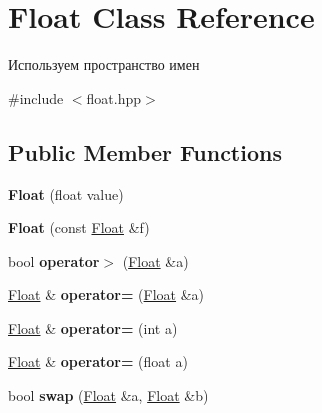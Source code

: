 \hypertarget{class_float}{\section{Float Class Reference}
\label{class_float}
}


Используем пространство имен  




{\ttfamily \#include $<$float.\-hpp$>$}

\subsection*{Public Member Functions}
\begin{DoxyCompactItemize}
\item 
\hypertarget{class_float_ac5e141ba92d856c7e79aa4e66a745f37}{{\bfseries Float} (float value)}\label{class_float_ac5e141ba92d856c7e79aa4e66a745f37}

\item 
\hypertarget{class_float_a60856232c5ef354213ca4ecb475d8a6f}{{\bfseries Float} (const \hyperlink{class_float}{Float} \&f)}\label{class_float_a60856232c5ef354213ca4ecb475d8a6f}

\item 
\hypertarget{class_float_a53950aae3831a057894e66bc11540e42}{bool {\bfseries operator$>$} (\hyperlink{class_float}{Float} \&a)}\label{class_float_a53950aae3831a057894e66bc11540e42}

\item 
\hypertarget{class_float_a4a77c416294ca66c1be47e2aa58902c8}{\hyperlink{class_float}{Float} \& {\bfseries operator=} (\hyperlink{class_float}{Float} \&a)}\label{class_float_a4a77c416294ca66c1be47e2aa58902c8}

\item 
\hypertarget{class_float_a9fde2d75790d8c51813e3bc3cb11112b}{\hyperlink{class_float}{Float} \& {\bfseries operator=} (int a)}\label{class_float_a9fde2d75790d8c51813e3bc3cb11112b}

\item 
\hypertarget{class_float_a4657b5b095492e5b6b129c7cd141ae2f}{\hyperlink{class_float}{Float} \& {\bfseries operator=} (float a)}\label{class_float_a4657b5b095492e5b6b129c7cd141ae2f}

\item 
\hypertarget{class_float_ad2b814c2bb27a468cae873c56c621ab1}{bool {\bfseries swap} (\hyperlink{class_float}{Float} \&a, \hyperlink{class_float}{Float} \&b)}\label{class_float_ad2b814c2bb27a468cae873c56c621ab1}

\end{DoxyCompactItemize}


